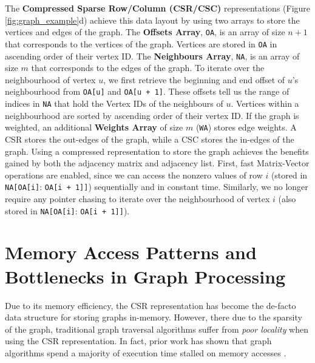The \textbf{Compressed Sparse Row/Column (\ac{CSR}/\ac{CSC})} representations (Figure \ref{fig:graph_example}d) achieve this data layout by using two arrays to store the vertices and edges of the graph. The \textbf{Offsets Array}, \texttt{OA}, is an array of size $n+1$ that corresponds to the vertices of the graph. Vertices are stored in \texttt{OA} in ascending order of their vertex ID. The \textbf{Neighbours Array}, \texttt{NA}, is an array of size $m$ that corresponds to the edges of the graph. To iterate over the neighbourhood of vertex $u$, we first retrieve the beginning and end offset of $u$'s neighbourhood from \texttt{OA[u]} and \texttt{OA[u + 1]}. These offsets tell us the range of indices in \texttt{NA} that hold the Vertex IDs of the neighbours of $u$. Vertices within a neighbourhood are sorted by ascending order of their vertex ID. If the graph is weighted, an additional \textbf{Weights Array} of size $m$ (\texttt{WA}) stores edge weights. A \ac{CSR} stores the out-edges of the graph, while a \ac{CSC} stores the in-edges of the graph. Using a compressed representation to store the graph achieves the benefits gained by both the adjacency matrix and adjacency list.
First, fast Matrix-Vector operations are enabled, since we can access the nonzero values of row $i$ (stored in \texttt{NA[}\texttt{OA[i]}: \texttt{OA[i + 1]}\texttt{]}) sequentially and in constant time.
Similarly, we no longer require any pointer chasing to iterate over the neighbourhood of vertex $i$ (also stored in \texttt{NA[}\texttt{OA[i]}: \texttt{OA[i + 1]}\texttt{]}).

\section{Memory Access Patterns and Bottlenecks in Graph Processing}
Due to its memory efficiency, the \ac{CSR} representation has become the de-facto data structure for storing graphs in-memory. However, there due to the sparsity of the graph, traditional graph traversal algorithms suffer from \textit{poor locality} when using the \ac{CSR} representation. In fact, prior work has shown that graph algorithms spend a majority of execution time stalled on memory accesses \cite{zhang2016optimizing}. 


